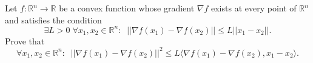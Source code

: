 Let $f:\mathbb{R}^{n}\rightarrow \mathbb{R}$ be a convex function whose gradient $\nabla f$
exists at every point of $\mathbb{R}^{n}$ and satisfies the condition
$$\exists L>0\; \forall x_{1},x_{2}\in \mathbb{R}^{n}:\;\; ||\nabla f(x_{1})-\nabla f(x_{2})||\leq L||x_{1}-x_{2}||.$$Prove that
$$ \forall x_{1},x_{2}\in \mathbb{R}^{n}:\;\; ||\nabla f(x_{1})-\nabla f(x_{2})||^{2}\leq L\langle\nabla f(x_{1})-\nabla f(x_{2}), x_{1}-x_{2}\rangle. $$
